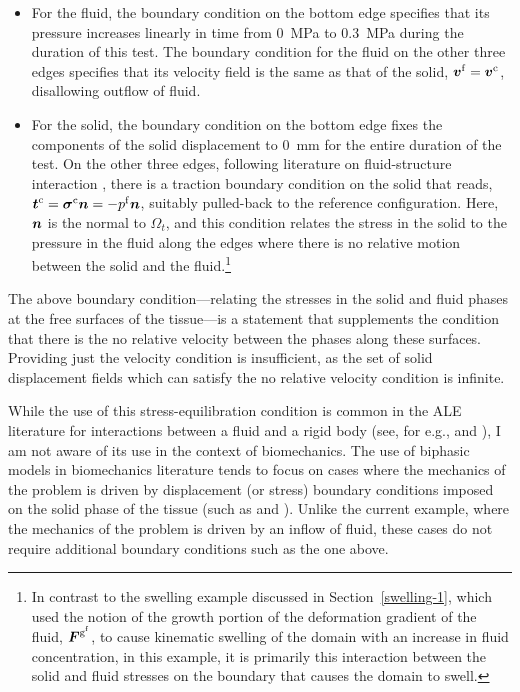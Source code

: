 \begin{itemize}
\item For the fluid, the boundary condition on the bottom edge
  specifies that its pressure increases linearly in time from 0~MPa to
  0.3~MPa during the duration of this test. The boundary condition for
  the fluid on the other three edges specifies that its velocity field
  is the same as that of the solid, $\mbox{\boldmath$ v$}^{\mathrm{f}} =
  \mbox{\boldmath$ v$}^{\mathrm{c}}$, disallowing outflow of fluid.
\item For the solid, the boundary condition on the bottom edge fixes
  the components of the solid displacement to 0~mm for the entire
  duration of the test. On the other three edges, following literature
  on fluid-structure interaction \citep{doneaetal2004}, there is a
  traction boundary condition on the solid that reads,
  $\mbox{\boldmath$ t$}^{\mathrm{c}}=\mbox{\boldmath$\sigma$}^{\mathrm{c}} \mbox{\boldmath$ n$} = -p^{\mathrm{f}} \mbox{\boldmath$ n$}$,
  suitably pulled-back to the reference configuration. Here, $\mbox{\boldmath$ n$}$ is
  the normal to $\Omega_{t}$, and this condition relates the stress in
  the solid to the pressure in the fluid along the edges where there
  is no relative motion between the solid and the fluid.\footnote{In
    contrast to the swelling example discussed in
    Section~\ref{swelling-1}, which used the notion of the growth
    portion of the deformation gradient of the fluid,
    $\mbox{\boldmath$ F$}^{\mathrm{g}^\mathrm{f}}$, to cause kinematic swelling of the
    domain with an increase in fluid concentration, in this example,
    it is primarily this interaction between the solid and fluid
    stresses on the boundary that causes the domain to swell.}
\end{itemize}

The above boundary condition---relating the stresses in the solid and
fluid phases at the free surfaces of the tissue---is a statement that
supplements the condition that there is the no relative velocity
between the phases along these surfaces. Providing just the velocity
condition is insufficient, as the set of solid displacement fields
which can satisfy the no relative velocity condition is infinite.

While the use of this stress-equilibration condition is common in the
ALE literature for interactions between a fluid and a rigid body (see,
for e.g., \citet{nomurahughes1992} and \citet{sarrateetal2001}), I am
not aware of its use in the context of biomechanics. The use of
biphasic models in biomechanics literature tends to focus on cases
where the mechanics of the problem is driven by displacement (or
stress) boundary conditions imposed on the solid phase of the tissue
(such as \citet{spilkersuh1990} and \citet{Disilvestroetal:2001}).
Unlike the current example, where the mechanics of the problem is
driven by an inflow of fluid, these cases do not require additional
boundary conditions such as the one above.

